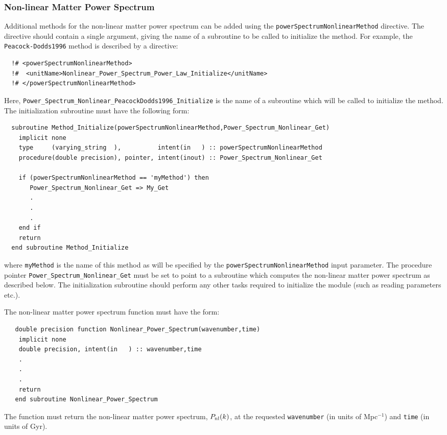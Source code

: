 \subsubsection{Non-linear Matter Power Spectrum}

Additional methods for the non-linear matter power spectrum can be added using the {\tt powerSpectrumNonlinearMethod} directive. The directive should contain a single argument, giving the name of a subroutine to be called to initialize the method. For example, the {\tt Peacock-Dodds1996} method is described by a directive:
\begin{verbatim}
  !# <powerSpectrumNonlinearMethod>
  !#  <unitName>Nonlinear_Power_Spectrum_Power_Law_Initialize</unitName>
  !# </powerSpectrumNonlinearMethod>
\end{verbatim}
Here, {\tt Power\_Spectrum\_Nonlinear\_PeacockDodds1996\_Initialize} is the name of a subroutine which will be called to initialize the method. The initialization subroutine must have the following form:
\begin{verbatim}
  subroutine Method_Initialize(powerSpectrumNonlinearMethod,Power_Spectrum_Nonlinear_Get)
    implicit none
    type     (varying_string  ),          intent(in   ) :: powerSpectrumNonlinearMethod
    procedure(double precision), pointer, intent(inout) :: Power_Spectrum_Nonlinear_Get
    
    if (powerSpectrumNonlinearMethod == 'myMethod') then
       Power_Spectrum_Nonlinear_Get => My_Get
       .
       .
       .
    end if
    return
  end subroutine Method_Initialize
\end{verbatim}
where {\tt myMethod} is the name of this method as will be specified by the {\tt powerSpectrumNonlinearMethod} input parameter. The procedure pointer {\tt Power\_Spectrum\_Nonlinear\_Get} must be set to point to a subroutine which computes the non-linear matter power spectrum as described below. The initialization subroutine should perform any other tasks required to initialize the module (such as reading parameters etc.).

The non-linear matter power spectrum function must have the form:
\begin{verbatim}
   double precision function Nonlinear_Power_Spectrum(wavenumber,time)
    implicit none
    double precision, intent(in   ) :: wavenumber,time
    .
    .
    .
    return
   end subroutine Nonlinear_Power_Spectrum
\end{verbatim}
The function must return the non-linear matter power spectrum, $P_{\rm nl}(k)$, at the requested {\tt wavenumber} (in units of Mpc$^{-1}$) and {\tt time} (in units of Gyr).

